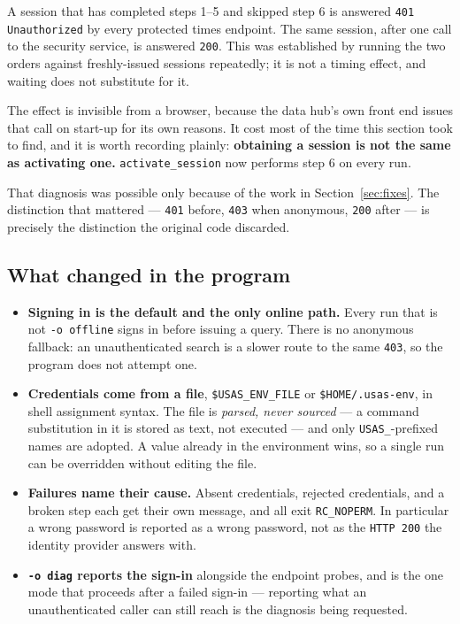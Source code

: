 \documentclass[11pt]{article}
\newcommand{\code}[1]{\texttt{#1}}
\begin{document}
\noindent A session that has completed steps 1--5 and skipped step 6 is
answered \code{401 Unauthorized} by every protected times endpoint.
The same session, after one call to the security service, is answered
\code{200}.  This was established by running the two orders against
freshly-issued sessions repeatedly; it is not a timing effect, and
waiting does not substitute for it.

The effect is invisible from a browser, because the data hub's own
front end issues that call on start-up for its own reasons.  It cost
most of the time this section took to find, and it is worth recording
plainly: \textbf{obtaining a session is not the same as activating
one.}  \code{activate\_session} now performs step 6 on every run.

That diagnosis was possible only because of the work in
Section~\ref{sec:fixes}.  The distinction that mattered ---
\code{401} before, \code{403} when anonymous, \code{200} after --- is
precisely the distinction the original code discarded.

\subsection{What changed in the program}

\begin{itemize}[leftmargin=*]
\item \textbf{Signing in is the default and the only online path.}
      Every run that is not \code{-o offline} signs in before issuing a
      query.  There is no anonymous fallback: an unauthenticated search
      is a slower route to the same \code{403}, so the program does not
      attempt one.
\item \textbf{Credentials come from a file},
      \code{\$USAS\_ENV\_FILE} or \code{\$HOME/.usas-env}, in shell
      assignment syntax.  The file is \emph{parsed, never sourced} --- a
      command substitution in it is stored as text, not executed --- and
      only \code{USAS\_}-prefixed names are adopted.  A value already in
      the environment wins, so a single run can be overridden without
      editing the file.
\item \textbf{Failures name their cause.}  Absent credentials, rejected
      credentials, and a broken step each get their own message, and
      all exit \code{RC\_NOPERM}.  In particular a wrong password is
      reported as a wrong password, not as the \code{HTTP 200} the
      identity provider answers with.
\item \textbf{\code{-o diag} reports the sign-in} alongside the
      endpoint probes, and is the one mode that proceeds after a failed
      sign-in --- reporting what an unauthenticated caller can still
      reach is the diagnosis being requested.
\end{itemize}
\end{document}
